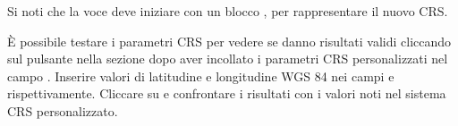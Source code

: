 Si noti che la voce  deve iniziare con un blocco ,
per rappresentare il nuovo CRS.

È possibile testare i parametri CRS per vedere se danno risultati validi
cliccando sul pulsante  nella sezione  dopo
aver incollato i parametri CRS personalizzati nel campo .
Inserire valori di latitudine e longitudine WGS 84 nei campi  e
 rispettivamente. 
Cliccare su  e confrontare i risultati con i valori noti nel
sistema CRS personalizzato. 

